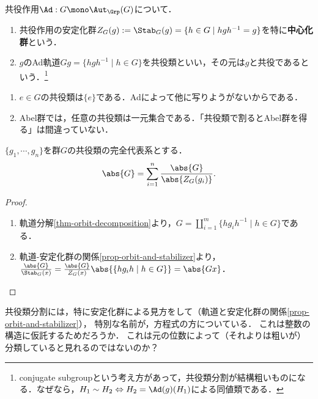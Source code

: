 \documentclass[uplatex,dvipdfmx]{jsreport}
\begin{document}
\begin{definition}
    共役作用$\Ad:G\mono\Aut_\Grp(G)$について．
    \begin{enumerate}
        \item 共役作用の安定化群$Z_G(g):=\Stab_G(g)=\{h\in G\mid hgh^{-1}=g\}$を特に\textbf{中心化群}という．
        \item $g$のAd軌道$Gg=\{hgh^{-1}\mid h\in G\}$を共役類といい，その元は$g$と共役であるという．\footnote{conjugate subgroupという考え方があって，共役類分割が結構粗いものになる．なぜなら，$H_1\sim H_2\Leftrightarrow H_2=\Ad(g)(H_1)$による同値類である．}
    \end{enumerate}
\end{definition}

\begin{example}[共役類は可換でない要素を括り出す位相である]\mbox{}
    \begin{enumerate}
        \item $e\in G$の共役類は$\{e\}$である．Adによって他に写りようがないからである．
        \item Abel群では，任意の共役類は一元集合である．「共役類で割るとAbel群を得る」は間違っていない．
    \end{enumerate}
\end{example}

\begin{proposition}
    $\{g_1,\cdots,g_n\}$を群$G$の共役類の完全代表系とする．
    \[\abs{G}=\sum^n_{i=1}\frac{\abs{G}}{\abs{Z_G(g_i)}}.\]
\end{proposition}
\begin{proof}\mbox{}
    \begin{enumerate}
        \item 軌道分解\ref{thm-orbit-decomposition}より，$G=\coprod_{i=1}^m\{hg_ih^{-1}\mid h\in G\}$である．
        \item 軌道-安定化群の関係\ref{prop-orbit-and-stabilizer}より，$\frac{\abs{G}}{\Stab_G(x)}=\frac{\abs{G}}{Z_G(x)}\abs{\{hg_ih\mid h\in G\}}=\abs{Gx}$．
    \end{enumerate}
\end{proof}
\begin{remarks}
    共役類分割には，特に安定化群による見方をして（軌道と安定化群の関係\ref{prop-orbit-and-stabilizer}），
    特別な名前が，方程式の方についている．
    これは整数の構造に仮託するためだろうか．
    これは元の位数によって（それよりは粗いが）分類していると見れるのではないのか？
\end{remarks}
\end{document}
